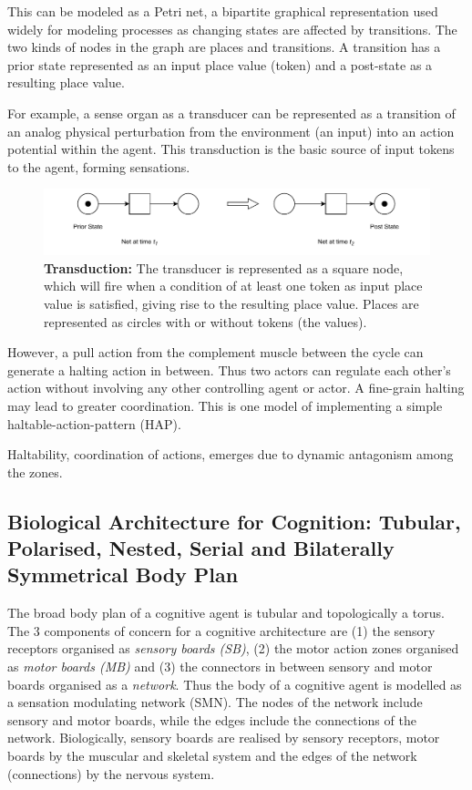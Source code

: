 This can be modeled as a Petri net, a bipartite graphical representation used widely for modeling processes as changing states are affected by transitions. The two kinds of nodes in the graph are places and transitions. A transition has a prior state represented as an input place value (token) and a post-state as a resulting place value. 

For example, a sense organ as a transducer can be represented as a transition of an analog physical perturbation from the environment (an input) into an action potential within the agent. This transduction is the basic source of input tokens to the agent, forming sensations.
\begin{figure}[ht] 
\includegraphics[width=\textwidth]{graphics/PN_Transduction.pdf}
\caption{\textbf{Transduction:
}The transducer is represented as a square node, which will fire when a condition of at least one token as input place value is satisfied, giving rise to the resulting place value.
Places are represented as circles with or without tokens (the values).}
\label{transduction}
\end{figure}


However, a pull action from the complement muscle between the cycle can generate a halting action in between.  Thus two actors can regulate each other's action without involving any other controlling agent or actor. A fine-grain halting may lead to greater coordination.  This is one model of implementing a simple haltable-action-pattern (HAP). 

Haltability, coordination of actions, emerges due to dynamic antagonism among the zones.  

\subsection{Biological Architecture for Cognition: Tubular, Polarised, Nested, Serial and Bilaterally Symmetrical Body Plan}

The broad body plan of a cognitive agent is tubular and topologically a torus. The 3 components of concern for a cognitive architecture are (1) the sensory receptors organised as \textit{sensory boards (SB)}, (2) the motor action zones organised as \textit{motor boards (MB)} and (3) the connectors in between sensory and motor boards organised as a \textit{network}. Thus the body of a cognitive agent is modelled as a sensation modulating network (SMN). The nodes of the network include sensory and motor boards, while the edges include the connections of the network. Biologically, sensory boards are realised by sensory receptors, motor boards by the muscular and skeletal system and the edges of the network (connections) by the nervous system. 

